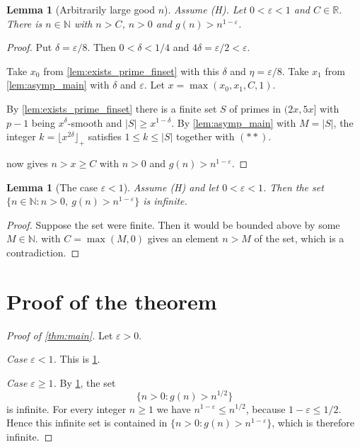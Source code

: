 \documentclass[11pt]{article}
\newtheorem{lemma}[theorem]{Lemma}
\theoremstyle{definition}
\theoremstyle{remark}
\newcommand{\floorp}[1]{\lfloor #1\rfloor_{+}}
\begin{document}
\begin{lemma}[Arbitrarily large good $n$]\label{lem:exists_good_n_large}
Assume (H). Let $0<\varepsilon<1$ and $C\in\mathbb{R}$. There is $n\in\mathbb{N}$ with $n>C$, $n>0$ and $g(n)>n^{1-\varepsilon}$.
\end{lemma}

\begin{proof}
Put $\delta=\varepsilon/8$. Then $0<\delta<1/4$ and $4\delta=\varepsilon/2<\varepsilon$.

Take $x_0$ from \cref{lem:exists_prime_finset} with this $\delta$ and $\eta=\varepsilon/8$. Take $x_1$ from \cref{lem:asymp_main} with $\delta$ and $\varepsilon$. Let $x=\max(x_0,x_1,C,1)$.

By \cref{lem:exists_prime_finset} there is a finite set $S$ of primes in $(2x,5x]$ with $p-1$ being $x^\delta$-smooth and $|S|\ge x^{1-\delta}$. By \cref{lem:asymp_main} with $M=|S|$, the integer $k=\floorp{x^{2\delta}}$ satisfies $1\le k\le|S|$ together with $(\ast\ast)$.

 now gives $n>x\ge C$ with $n>0$ and $g(n)>n^{1-\varepsilon}$.
\end{proof}

\begin{lemma}[The case $\varepsilon<1$]\label{lem:infinite_of_lt_one}
Assume (H) and let $0<\varepsilon<1$. Then the set $\{n\in\mathbb{N}:n>0,\ g(n)>n^{1-\varepsilon}\}$ is infinite.
\end{lemma}

\begin{proof}
Suppose the set were finite. Then it would be bounded above by some $M\in\mathbb{N}$.  with $C=\max(M,0)$ gives an element $n>M$ of the set, which is a contradiction.
\end{proof}

\section{Proof of the theorem}

\begin{proof}[Proof of \cref{thm:main}]
Let $\varepsilon>0$.

\emph{Case $\varepsilon<1$.} This is \cref{lem:infinite_of_lt_one}.

\emph{Case $\varepsilon\ge1$.} By \cref{lem:infinite_of_lt_one}, the set
\[
\{n>0: g(n)>n^{1/2}\}
\]
is infinite. For every integer $n\ge1$ we have $n^{1-\varepsilon}\le n^{1/2}$, because $1-\varepsilon\le1/2$. Hence this infinite set is contained in $\{n>0:g(n)>n^{1-\varepsilon}\}$, which is therefore infinite.
\end{proof}
\end{document}
